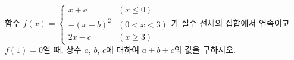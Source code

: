 함수 $f(x)=\begin{cases} x+a & (x\le 0) \\ -(x-b)^2 & (0<x<3) \\ 2x-c & (x\ge 3) \end{cases}$가 실수 전체의 집합에서 연속이고 $f(1)=0$일 때, 상수 $a$, $b$, $c$에 대하여 $a+b+c$의 값을 구하시오.
